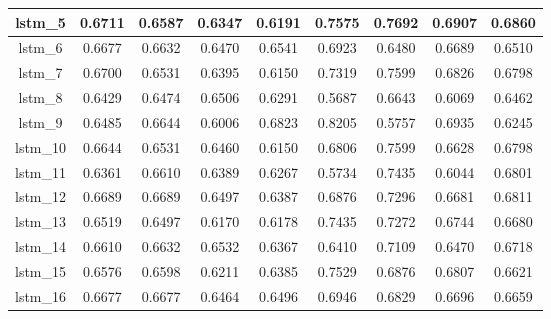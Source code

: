 \begin{table}[p]
\begin{tabular} {|c|c|c|c|c|c|c|c|c| }
        lstm\_5  & 0.6711                        & 0.6587                         & 0.6347                      & 0.6191                  & 0.7575 & 0.7692 & 0.6907 & 0.6860 \\ \hline
        lstm\_6  & 0.6677                        & 0.6632                         & 0.6470                      & 0.6541                  & 0.6923 & 0.6480 & 0.6689 & 0.6510 \\ \hline
        lstm\_7  & 0.6700                        & 0.6531                         & 0.6395                      & 0.6150                  & 0.7319 & 0.7599 & 0.6826 & 0.6798 \\ \hline
        lstm\_8  & 0.6429                        & 0.6474                         & 0.6506                      & 0.6291                  & 0.5687 & 0.6643 & 0.6069 & 0.6462 \\ \hline
        lstm\_9  & 0.6485                        & 0.6644                         & 0.6006                      & 0.6823                  & 0.8205 & 0.5757 & 0.6935 & 0.6245 \\ \hline
        lstm\_10 & 0.6644                        & 0.6531                         & 0.6460                      & 0.6150                  & 0.6806 & 0.7599 & 0.6628 & 0.6798 \\ \hline
        lstm\_11 & 0.6361                        & 0.6610                         & 0.6389                      & 0.6267                  & 0.5734 & 0.7435 & 0.6044 & 0.6801 \\ \hline
        lstm\_12 & 0.6689                        & 0.6689                         & 0.6497                      & 0.6387                  & 0.6876 & 0.7296 & 0.6681 & 0.6811 \\ \hline
        lstm\_13 & 0.6519                        & 0.6497                         & 0.6170                      & 0.6178                  & 0.7435 & 0.7272 & 0.6744 & 0.6680 \\ \hline
        lstm\_14 & 0.6610                        & 0.6632                         & 0.6532                      & 0.6367                  & 0.6410 & 0.7109 & 0.6470 & 0.6718 \\ \hline
        lstm\_15 & 0.6576                        & 0.6598                         & 0.6211                      & 0.6385                  & 0.7529 & 0.6876 & 0.6807 & 0.6621 \\ \hline
        lstm\_16 & 0.6677                        & 0.6677                         & 0.6464                      & 0.6496                  & 0.6946 & 0.6829 & 0.6696 & 0.6659 \\ \hline

\end{tabular}
\end{table}
